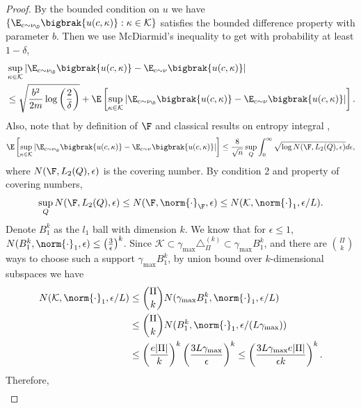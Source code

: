 \documentclass{article}
\newcommand{\mc}[1]{\mathcal{#1}}
\newcommand{\1}{\mathbf{1}}
\begin{document}
\begin{proof}
By the bounded condition on $u$ we have $\{\E_{c\sim\nu_\D}\bigbrak{u(c,\kappa)}: \kappa\in\mc{K}\}$ satisfies the bounded difference property with parameter $b$. Then we use McDiarmid's inequality to get with probability at least $1-\delta$,
\begin{align*}
    &\sup_{\kappa\in\mc{K}}\left|\E_{c\sim\nu_\D}\bigbrak{u(c,\kappa)}-\E_{c\sim\nu}\bigbrak{u(c,\kappa)}\right|\\
    &\leq \sqrt{\frac{b^2}{2m}\log\left(\frac{2}{\delta}\right)}+\E\left[\sup_{\kappa\in\mc{K}}\left|\E_{c\sim\nu_\D}\bigbrak{u(c,\kappa)}-\E_{c\sim\nu}\bigbrak{u(c,\kappa)}\right|\right].
\end{align*}
Also, note that by definition of $\F$ and classical results on entropy integral \cite{van2000asymptotic},
\[\E\left[\sup_{\kappa\in\mc{K}}\left|\E_{c\sim\nu_\D}\bigbrak{u(c,\kappa)}-\E_{c\sim\nu}\bigbrak{u(c,\kappa)}\right|\right]\leq\frac{8}{\sqrt{n}}\sup_Q \int_{0}^{\infty} \sqrt{\log N(\F, L_2(Q), \epsilon)} d \epsilon,\]
where $N(\F, L_2(Q), \epsilon)$ is the covering number. By condition 2 and property of covering numbers, 
\[\sup_Q N(\F, L_2(Q), \epsilon) \leq  N(\F, \norm{\cdot}_\F, \epsilon) \leq N(\mc{K}, \norm{\cdot}_1, \epsilon/L).\]
Denote $B_1^k$ as the $l_1$ ball with dimension $k$. We know that for $\epsilon\leq 1$, $N(B_1^k, \norm{\cdot}_1, \epsilon)\leq \left(\frac{3}{\epsilon}\right)^k$. Since $\mc{K}\subset\gamma_{\max}\triangle_\Pi^{(k)}\subset \gamma_{\max}B_1^k$, and there are $\binom{\Pi}{k}$ ways to choose such a support $\gamma_{\max}B_1^k$, by union bound over $k$-dimensional subspaces we have 
\begin{align*}
    N(\mc{K}, \norm{\cdot}_1, \epsilon/L)&\leq \binom{\Pi}{k}N(\gamma_{\max}B_1^k, \norm{\cdot}_1, \epsilon/L)\\
    &\leq\binom{\Pi}{k}N(B_1^k, \norm{\cdot}_1, \epsilon/(L\gamma_{\max}))\\
    &\leq\left(\frac{e |\Pi|}{k}\right)^{k}\left(\frac{3L\gamma_{\max}}{\epsilon}\right)^{k} \leq \left(\frac{3L\gamma_{\max}e|\Pi|}{\epsilon k}\right)^k.
\end{align*}
Therefore, 
\begin{align*}

\end{align*}
\end{proof}
\end{document}
